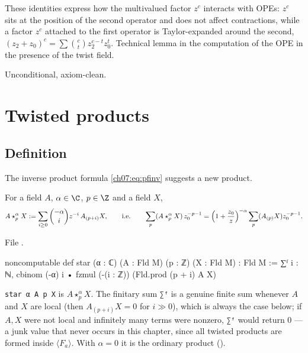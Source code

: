 \begin{physics}
These identities express how the multivalued factor $z^c$ interacts with OPEs: $z^c$ sits at the position of the second operator and does not affect contractions, while a factor $z^c$ attached to the first operator is Taylor-expanded around the second, $(z_2+z_0)^c=\sum\binom ct z_2^{c-t}z_0^t$. Technical lemma in the computation of the OPE in the presence of the twist field.
\end{physics}

\begin{status}
Unconditional, axiom-clean.
\end{status}

\section{Twisted products}\label{ch07:sec:star}

\subsection{Definition}

The inverse product formula \eqref{ch07:eq:pfinv} suggests a new product.

\begin{definition}\label{ch07:def:star}
For a field $A$, $\alpha\in\C$, $p\in\Z$ and a field $X$,
\begin{equation*}
  A\star^{\alpha}_{p}X := \sum_{i\ge0}\binom{-\alpha}{i}z^{-i}\,A_{(p+i)}X,
  \qquad\text{i.e.}\qquad \sum_p (A\star^\alpha_pX)\,z_0^{-p-1} = \Bigl(1+\frac{z_0}{z}\Bigr)^{-\alpha}
  \sum_p (A_{(p)}X)z_0^{-p-1}.
\end{equation*}
\end{definition}

\noindent File .
\begin{leancode}
noncomputable def star (α : ℂ) (A : Fld M) (p : ℤ) (X : Fld M) : Fld M :=
  ∑ᶠ i : ℕ, cbinom (-α) i • fzmul (-(i : ℤ)) (Fld.prod (p + i) A X)
\end{leancode}

\begin{dictionary}
\verb|star α A p X| is $A\star^\alpha_pX$. The finitary sum \verb|∑ᶠ| is a genuine finite sum
whenever $A$ and $X$ are local (then $A_{(p+i)}X = 0$ for $i\gg0$), which is always the case
below; if $A,X$ were not local and infinitely many terms were nonzero, \verb|∑ᶠ| would return
$0$ --- a junk value that never occurs in this chapter, since all twisted products are formed
inside $\langle F_a\rangle$. With $\alpha=0$ it is the ordinary product ().
\end{dictionary}

